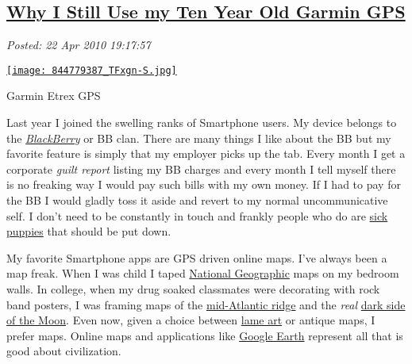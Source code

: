 %

\subsection*{\href{http://bakerjd99.wordpress.com/2010/04/22/why-i-still-use-my-ten-year-old-garmin-gps/}{Why I Still Use my Ten Year Old Garmin GPS}}


\noindent\emph{Posted: 22 Apr 2010 19:17:57}
\vspace{6pt}

\captionsetup[floatfigure]{labelformat=empty}
\begin{floatingfigure}[l]{0.30\textwidth}
\centering
\href{http://conceptcontrol.smugmug.com/Other/utilimages-1/8074217\_BQjXN\#844779387\_TFxgn-A-LB}{\texttt{[image: 844779387\_TFxgn-S.jpg]}}
\caption{Garmin  Etrex  GPS}
\label{fig:506X0}
\end{floatingfigure}Last year I joined the swelling ranks of Smartphone users. My device
belongs to the \emph{\href{http://www.blackberry.com/}{BlackBerry}} or BB
clan. There are many things I like about the BB but my favorite feature
is simply that my employer picks up the tab. Every month I get a
corporate \emph{guilt report} listing my BB charges and every month I
tell myself there is no freaking way I would pay such bills with my own
money. If I had to pay for the BB I would gladly toss it aside and
revert to my normal uncommunicative self. I don't need to be constantly
in touch and frankly people who do are
\href{http://www.sickpuppies.net/}{sick puppies} that should be put
down.




My favorite Smartphone apps are GPS driven online maps. I've always been
a map freak. When I was child I taped
\href{http://www.nationalgeographic.com/}{National Geographic} maps on
my bedroom walls. In college, when my drug soaked classmates were
decorating with rock band posters, I was framing maps of the
\href{http://en.wikipedia.org/wiki/Mid-Atlantic\_Ridge}{mid-Atlantic
ridge} and the \emph{real}
\href{http://www.wired.com/wiredscience/2007/11/the-most-beauti/}{dark
side of the Moon}. Even now, given a choice between
\href{http://brlogsbane.wordpress.com/2008/04/29/why-all-the-lame-art/}{lame
art} or antique maps, I prefer maps. Online maps and applications like
\href{http://earth.google.com/index.html}{Google Earth} represent all
that is good about civilization.

